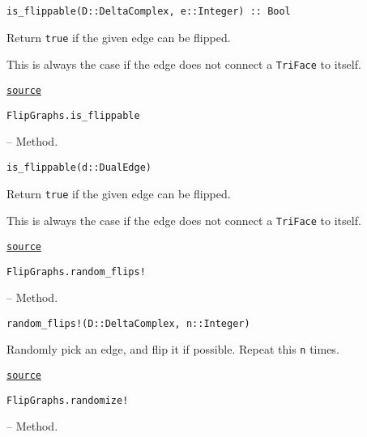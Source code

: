 \begin{adjustwidth}{2em}{0pt}


\begin{verbatim}
is_flippable(D::DeltaComplex, e::Integer) :: Bool
\end{verbatim}

Return \texttt{true} if the given edge can be flipped.

This is always the case if the edge does not connect a \texttt{TriFace} to itself.



\href{https://github.com/schto223/FlipGraphs.jl/blob/490c01a7adf74b42f27dda05099165c47ae8133e/src/deltaComplex.jl#L838-L844}{\texttt{source}}


\end{adjustwidth}
\hypertarget{2293470848079560427}{\texttt{FlipGraphs.is\_flippable}}  -- {Method.}

\begin{adjustwidth}{2em}{0pt}


\begin{verbatim}
is_flippable(d::DualEdge)
\end{verbatim}

Return \texttt{true} if the given edge can be flipped.

This is always the case if the edge does not connect a \texttt{TriFace} to itself.



\href{https://github.com/schto223/FlipGraphs.jl/blob/490c01a7adf74b42f27dda05099165c47ae8133e/src/deltaComplex.jl#L849-L855}{\texttt{source}}


\end{adjustwidth}
\hypertarget{5742364185354903394}{\texttt{FlipGraphs.random\_flips!}}  -- {Method.}

\begin{adjustwidth}{2em}{0pt}


\begin{verbatim}
random_flips!(D::DeltaComplex, n::Integer)
\end{verbatim}

Randomly pick an edge, and flip it if possible. Repeat this \texttt{n} times.



\href{https://github.com/schto223/FlipGraphs.jl/blob/490c01a7adf74b42f27dda05099165c47ae8133e/src/deltaComplex.jl#L1023-L1027}{\texttt{source}}


\end{adjustwidth}
\hypertarget{6729796171434163830}{\texttt{FlipGraphs.randomize!}}  -- {Method.}

